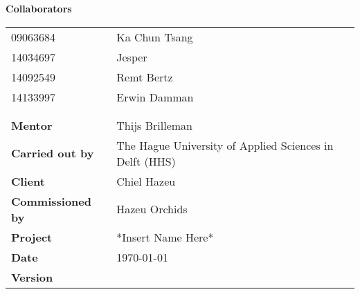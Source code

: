 \begin{titlepage}
	
	\begin{center}
		\LARGE{\textbf{\thistitle}}
	\end{center}
	
	\begin{figure}[h]
	\end{figure}
	
	\bigskip
	\textbf{Collaborators}
	\begin{table}[h]
		\begin{tabular}{@{}ll@{}}
			09063684                 & Ka Chun Tsang                                           \\
			14034697                 & Jesper                            		               \\
			14092549                 & Remt Bertz                	                           \\
			14133997                 & Erwin Damman                                            \\
			&              										   \\
			&              										   \\
			\textbf{Mentor}          & Thijs Brilleman                                         \\
			\textbf{Carried out by}  & The Hague University of Applied Sciences in Delft (HHS) \\
			\textbf{Client}          & Chiel Hazeu                                             \\
			\textbf{Commissioned by} & Hazeu Orchids                                           \\
			\textbf{Project}         & *Insert Name Here*                                      \\
			\textbf{Date}            & \today                                                  \\
			\textbf{Version}         & \version          									   \\
		\end{tabular}
	\end{table}
\end{titlepage}


